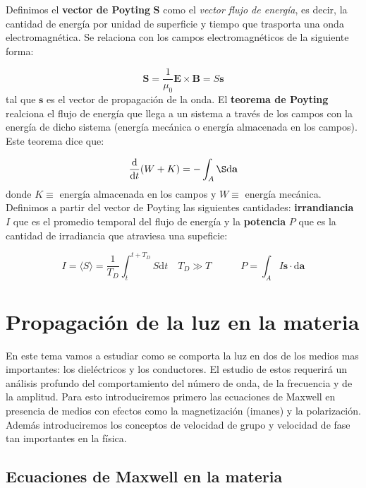 \documentclass[12pt]{article}
\newcommand{\D}{\mathrm{d}}
\newcommand{\tquad}{\quad \quad \quad}
\newcommand{\Bn}{\mathbf{B}}
\newcommand{\En}{\mathbf{E}}
\newcommand{\an}{\mathbf{a}}
\newcommand{\Sn}{\mathbf{S}}
\newcommand{\sn}{\mathbf{s}}
\numberwithin{equation}{section}
\numberwithin{figure}{section}
\begin{document}
Definimos el \textbf{vector de Poyting} $\Sn$ como el \textit{vector flujo de energía}, es decir, la cantidad de energía por unidad de superficie y tiempo que trasporta una onda electromagnética. Se relaciona con los campos electromagnéticos de la siguiente forma:

\begin{equation}
\Sn =  \dfrac{1}{\mu_0} \En \times \Bn = S \sn
\end{equation}
tal que $\sn$ es el vector de propagación de la onda. El \textbf{teorema de Poyting} realciona el flujo de energía que llega a un sistema a través de los campos con la energía de dicho sistema (energía mecánica o energía almacenada en los campos). Este teorema dice que:

\begin{equation}
\dfrac{\D}{\D t} (W+K) = - \int_A \S \D \an
\end{equation}
donde $K \equiv$ energía almacenada en los campos y $W \equiv $ energía mecánica. Definimos a partir del vector de Poyting las siguientes cantidades: \textbf{irrandiancia} $I$ que es el promedio temporal del flujo de energía y la \textbf{potencia} $P$ que es la cantidad de irradiancia que atraviesa una supeficie:

\begin{equation}
I = \langle S \rangle = \dfrac{1}{T_D} \int_t^{t+T_D} S \D t \quad T_D \gg T \tquad P = \int_A I \sn \cdot \D \an 
\end{equation}





\newpage

\section{Propagación de la luz en la materia}

En este tema vamos a estudiar como se comporta la luz en dos de los medios mas importantes: los dieléctricos y los conductores. El estudio de estos requerirá un análisis profundo del comportamiento del número de onda, de la frecuencia y de la amplitud. Para esto introduciremos primero las ecuaciones de Maxwell en presencia de medios con efectos como la magnetización (imanes) y la polarización. Además introduciremos los conceptos de velocidad de grupo y velocidad de fase tan importantes en la física. 

\subsection{Ecuaciones de Maxwell en la materia}
\end{document}
